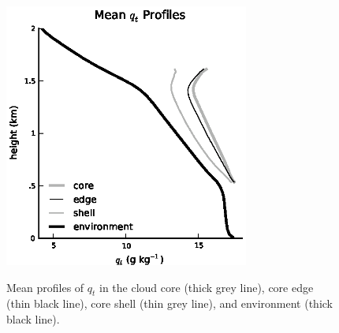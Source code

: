 \documentclass[12pt]{article}
\begin{document}
\begin{figure}[t]
  \noindent\includegraphics[width=19pc,angle=0]{./figures/shell_edge_profiles_core}\\
  \caption{Mean profiles of $q_t$ in the cloud core (thick grey line), core 
edge (thin black line), core shell (thin grey line), and environment (thick 
black line).}\label{fig:shell_edge_profiles}
\end{figure}
\end{document}
